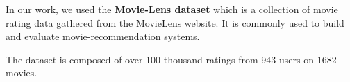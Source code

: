 In our work, we used the \textbf{Movie-Lens dataset} which is a collection of movie rating data gathered from the MovieLens website. It is commonly used to build and evaluate movie-recommendation systems.

The dataset is composed of over 100 thousand ratings from 943 users on 1682 movies.